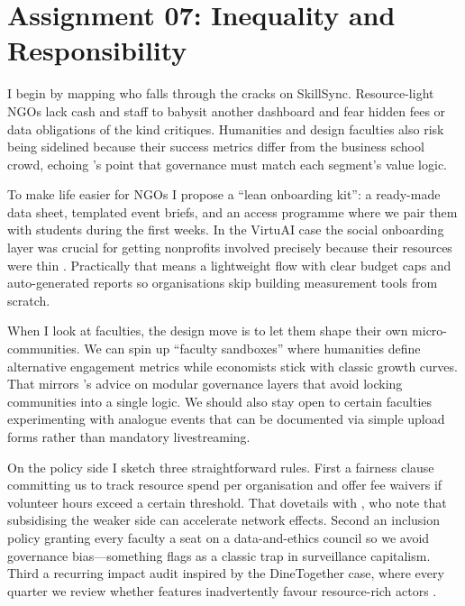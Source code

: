 \section*{Assignment 07: Inequality and Responsibility}

I begin by mapping who falls through the cracks on SkillSync. Resource-light NGOs lack cash and staff to babysit another dashboard and fear hidden fees or data obligations of the kind \citet{Srnicek2017} critiques. Humanities and design faculties also risk being sidelined because their success metrics differ from the business school crowd, echoing \citet{Choudary2016}'s point that governance must match each segment’s value logic.

To make life easier for NGOs I propose a ``lean onboarding kit'': a ready-made data sheet, templated event briefs, and an access programme where we pair them with students during the first weeks. In the VirtuAI case the social onboarding layer was crucial for getting nonprofits involved precisely because their resources were thin \citep{Gunasilan2024}. Practically that means a lightweight flow with clear budget caps and auto-generated reports so organisations skip building measurement tools from scratch.

When I look at faculties, the design move is to let them shape their own micro-communities. We can spin up ``faculty sandboxes'' where humanities define alternative engagement metrics while economists stick with classic growth curves. That mirrors \citet{Reillier2017}'s advice on modular governance layers that avoid locking communities into a single logic. We should also stay open to certain faculties experimenting with analogue events that can be documented via simple upload forms rather than mandatory livestreaming.

On the policy side I sketch three straightforward rules. First a fairness clause committing us to track resource spend per organisation and offer fee waivers if volunteer hours exceed a certain threshold. That dovetails with \citet{ShapiroVarian1999}, who note that subsidising the weaker side can accelerate network effects. Second an inclusion policy granting every faculty a seat on a data-and-ethics council so we avoid governance bias---something \citet{Zuboff2019} flags as a classic trap in surveillance capitalism. Third a recurring impact audit inspired by the DineTogether case, where every quarter we review whether features inadvertently favour resource-rich actors \citep{Rennella2023}.


